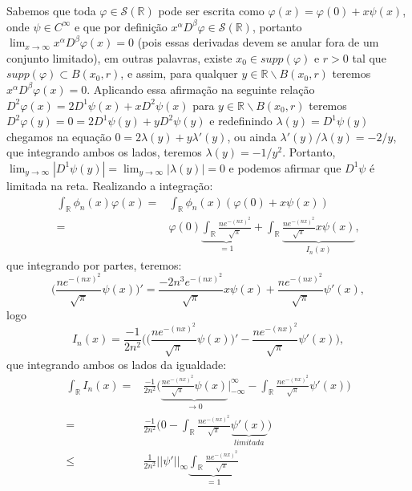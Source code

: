 \documentclass{article}
\begin{document}
\begin{enumerate}
\begin{enumerate}
				
				Sabemos que toda $\varphi \in \mathcal{S}(\mathbb{R})$ pode ser escrita como $\varphi(x) = \varphi(0) + x \psi(x)$, onde $\psi \in C^{\infty}$ e que por definição $x^{\alpha}D^{\beta}\varphi \in \mathcal{S}(\mathbb{R})$, portanto $\lim_{x \to \infty} x^{\alpha}D^{\beta}\varphi(x) = 0$ (pois essas derivadas devem se anular fora de um conjunto limitado), em outras palavras, existe $x_{0} \in supp(\varphi)$ e $r >0$ tal que $supp(\varphi) \subset B(x_{0}, r)$, e assim, para qualquer $y \in \mathbb{R} \backslash B(x_{0}, r)$ teremos $x^{\alpha}D^{\beta}\varphi(x) = 0$. Aplicando essa afirmação na seguinte relação $D^{2}\varphi(x) = 2D^{1}\psi(x) + x D^{2}\psi(x)$  para $y \in \mathbb{R} \backslash B(x_{0}, r)$ teremos $D^{2}\varphi(y)=0 = 2D^{1}\psi(y) + y D^{2}\psi(y)$ e redefinindo $\lambda(y) = D^{1}\psi(y)$ chegamos na equação $0 = 2\lambda(y)+y\lambda'(y)$, ou ainda $\lambda'(y)/\lambda(y) = -2/y$, que integrando ambos os lados, teremos $\lambda(y) = -1/y^{2}$. Portanto, $\lim_{y \to \infty} |D^{1}\psi(y)| = \lim_{y \to \infty} |\lambda(y)| = 0$ e podemos afirmar que $D^{1}\psi$ é limitada na reta.
				Realizando a integração:
				$$
				\begin{aligned}
				\int_{\mathbb{R}} \phi_{n}(x)\varphi(x) 
				= &\int_{\mathbb{R}} \phi_{n}(x)(\varphi(0) + x\psi(x)) \\
				= & \varphi(0) \underbrace{\int_{\mathbb{R}} \frac{ne^{-(nx)^{2}}}{\sqrt{\pi}} }_{=1} + \int_{\mathbb{R}} \underbrace{ \frac{ne^{-(nx)^{2}}}{\sqrt{\pi}} x\psi(x) }_{I_{n}(x)},
				\end{aligned}
				$$
				que integrando por partes, teremos:
				$$
				\Big(\frac{ne^{-(nx)^{2}}}{\sqrt{\pi}} \psi(x)\Big)' = \frac{-2n^{3}e^{-(nx)^{2}}}{\sqrt{\pi}} x\psi(x) + \frac{ne^{-(nx)^{2}}}{\sqrt{\pi}} \psi'(x), 
				$$
				logo
				$$
				I_{n}(x) = \frac{-1}{2n^{2}}	\Big( \Big( \frac{ne^{-(nx)^{2}}}{\sqrt{\pi}} \psi(x)\Big)' - \frac{ne^{-(nx)^{2}}}{\sqrt{\pi}} \psi'(x) \Big), 
				$$
				que integrando ambos os lados da igualdade:
				$$
				\begin{aligned}
				\int_{\mathbb{R}} I_{n}(x) 
				= & \frac{-1}{2n^{2}}	\Big(  \underbrace{ \frac{ne^{-(nx)^{2}}}{\sqrt{\pi}} \psi(x) }_{\to 0} \Big|^{\infty}_{-\infty} - \int_{\mathbb{R}} \frac{ne^{-(nx)^{2}}}{\sqrt{\pi}} \psi'(x) \Big) \\
				= & \frac{-1}{2n^{2}}	\Big(  0 - \int_{\mathbb{R}} \frac{ne^{-(nx)^{2}}}{\sqrt{\pi}} \underbrace{ \psi'(x) }_{limitada} \Big) \\
				\leq & \frac{1}{2n^{2}} ||\psi'||_{\infty} \underbrace{ \int_{\mathbb{R}} \frac{ne^{-(nx)^{2}}}{\sqrt{\pi}} }_{=1} \\

\end{aligned}$$
\end{enumerate}
\end{enumerate}
\end{document}
